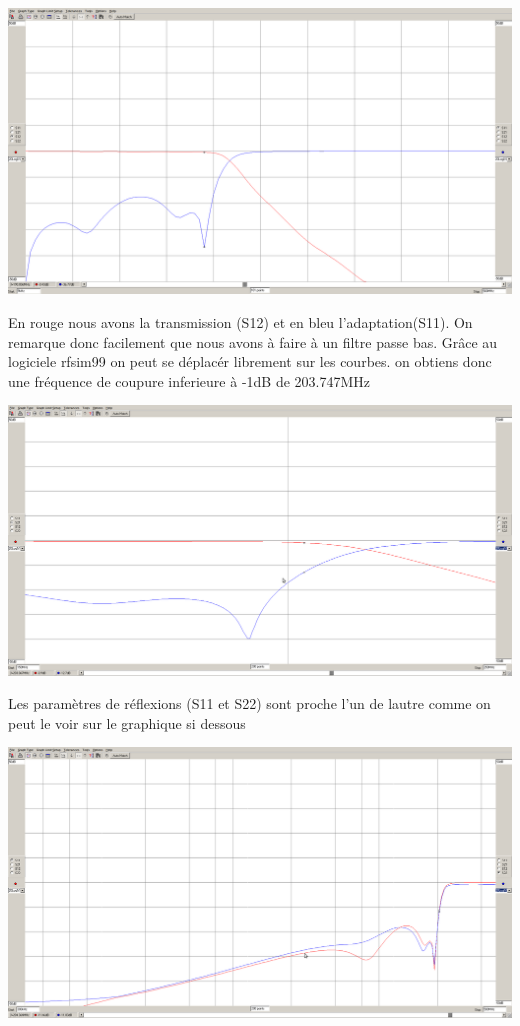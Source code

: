 \documentclass[a4paper,12pt]{report}            %
\begin{document}
\begin{center}\includegraphics[scale = 0.25]{pic/parametre_passe_bas.png}\\ \end{center}
En rouge nous avons la transmission (S12) et en bleu l'adaptation(S11). On remarque donc facilement que nous avons
à faire à un filtre passe bas. Grâce au logiciele rfsim99 on peut se déplacér librement sur les courbes.
on obtiens donc une fréquence de coupure inferieure à -1dB de 203.747MHz
\begin{center}\includegraphics[scale = 0.25]{pic/freq_coupure_pb.png}\\ \end{center}
Les paramètres de réflexions (S11 et S22) sont proche l'un de lautre comme on peut le voir sur le
graphique si dessous
\begin{center}\includegraphics[scale = 0.25]{pic/reflexion_pb.png}\\ \end{center}
\end{document}
